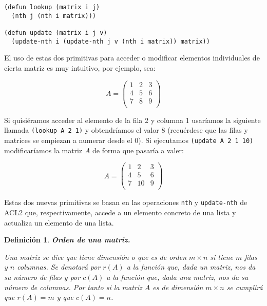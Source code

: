 \documentclass[a4paper,10pt]{article}
\newtheorem{defi}{{Definición}}
\begin{document}
\par \vspace{10pt}

\begin{lstlisting}[language=clips]
(defun lookup (matrix i j)
  (nth j (nth i matrix)))

(defun update (matrix i j v)
  (update-nth i (update-nth j v (nth i matrix)) matrix))
\end{lstlisting}

\par \vspace{10pt}

El uso de estas dos primitivas para acceder o modificar elementos individuales de cierta matriz es muy intuitivo, por ejemplo, sea:

$$
A=
\begin{pmatrix}
1 & 2 & 3 \\
4 & 5 & 6 \\
7 & 8 & 9 \\ 
\end{pmatrix}
$$ 

\par \vspace{10pt}

Si quisiéramos acceder al elemento de la fila 2 y columna 1 usaríamos la siguiente llamada \texttt{(lookup A 2 1)} y obtendríamos el valor 8 (recuérdese que las filas y matrices se empiezan a numerar desde el 0). Si ejecutamos \texttt{(update A 2 1 10)} modificaríamos la matriz $A$ de forma que pasaría a valer:

$$
A=
\begin{pmatrix}
1 & 2  & 3 \\
4 & 5 & 6 \\
7 & 10  & 9 \\ 
\end{pmatrix}
$$ 

\par \vspace{10pt}

Estas dos nuevas primitivas se basan en las operaciones \texttt{nth} y \texttt{update-nth} de ACL2 que, respectivamente, accede a un elemento concreto de una lista y actualiza un elemento de una lista.

\par \vspace{12pt}

\begin{defi} \textbf{Orden de una matriz.}\vspace{8pt}\par
Una matriz se dice que tiene \emph{dimensión} o que es de \emph{orden} $m \times n$ si tiene $m$ filas y $n$ columnas. Se denotará por $r(A)$ a la función que, dada un matriz, nos da su número de filas y por $c(A)$ a la función que, dada una matriz, nos da su número de columnas. Por tanto si la matriz $A$ es de dimensión $m \times n$ se cumplirá que $r(A) = m$ y que $c(A) = n$.
\end{defi}
\end{document}
